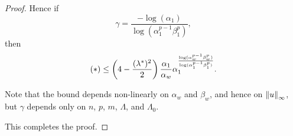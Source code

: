 \begin{proof}
Hence if 
\[ \gamma = \frac{-\log(\alpha_1)}{\log(\alpha_1^{p-1} \beta_1^p)},\]
then
\[ (*) \leq \left( 4-\frac{(\lambda^*)^2}{2} \right) \frac{\alpha_1}{\alpha_w} \alpha_1^\frac{\log(\alpha_w^{p-1} \beta_w^p)}{\log(\alpha_1^{p-1} \beta_1^p)}. \]

Note that the bound depends non-linearly on $\alpha_w$ and $\beta_w$, and hence on $\left\lVert u\right\rVert_{\infty}$, but $\gamma$ depends only on $n$, $p$, $m$, $\Lambda$, and $\Lambda_0$.  

This completes the proof.  


\end{proof}


%
%
%
